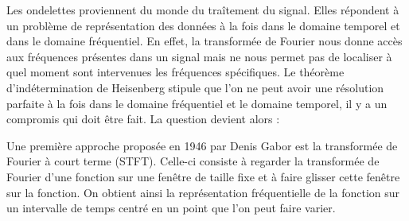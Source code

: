 
Les ondelettes proviennent du monde du traîtement du signal. Elles répondent à un problème de représentation des données à la fois dans le domaine temporel et dans le domaine fréquentiel. En effet, la transformée de Fourier nous donne accès aux fréquences présentes dans un signal mais ne nous permet pas de localiser à quel moment sont intervenues les fréquences spécifiques. Le théorème d'indétermination de Heisenberg stipule que l'on ne peut avoir une résolution parfaite à la fois dans le domaine fréquentiel et le domaine temporel, il y a un compromis qui doit être fait. La question devient alors :


Une première approche proposée en 1946 par Denis Gabor est la transformée de Fourier à court terme (STFT). Celle-ci consiste à regarder la transformée de Fourier d'une fonction sur une fenêtre de taille fixe et à faire glisser cette fenêtre sur la fonction. On obtient ainsi la représentation fréquentielle de la fonction sur un intervalle de temps centré en un point que l'on peut faire varier.

\bigskip


